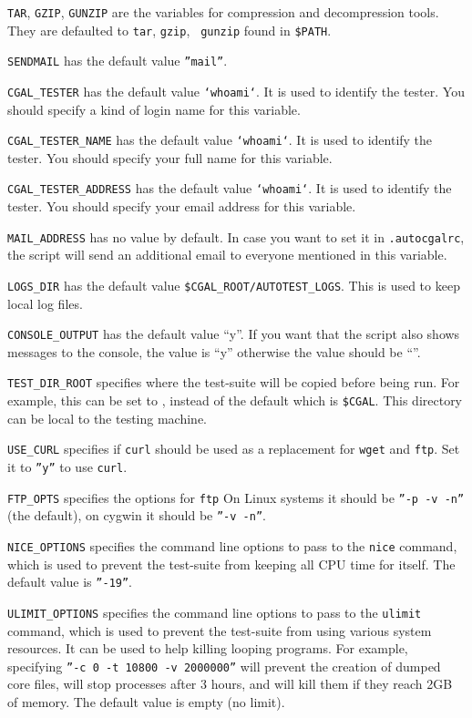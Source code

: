 {\tt TAR}, {\tt GZIP}, {\tt GUNZIP} are the variables for compression and
decompression tools.  They are defaulted to {\tt tar}, {\tt gzip}, {\tt
gunzip} found in {\tt \$PATH}.

{\tt SENDMAIL} has the default value {\tt ''mail''}.

{\tt CGAL\_TESTER} has the default value {\tt `whoami`}.  It is used to
identify the tester.  You should specify a kind of login name for this
variable.

{\tt CGAL\_TESTER\_NAME} has the default value {\tt `whoami`}.  It is used to
identify the tester.  You should specify your full name for this variable.

{\tt CGAL\_TESTER\_ADDRESS} has the default value {\tt `whoami`}.  It is used
to identify the tester.  You should specify your email address for this
variable.

{\tt MAIL\_ADDRESS} has no value by default. In case you want to
set it in {\tt .autocgalrc}, the script will send an additional email to
everyone mentioned in this variable.

{\tt LOGS\_DIR} has the default value {\tt \$CGAL\_ROOT/AUTOTEST\_LOGS}.  This
is used to keep local log files.

{\tt CONSOLE\_OUTPUT} has the default value ``y''. If you want that the script
 also shows messages to the console, the value is ``y'' otherwise the value
should be ``''.

{\tt TEST\_DIR\_ROOT} specifies where the test-suite will be copied before
being run.  For example, this can be set to , instead of the default
which is {\tt \$CGAL}.  This directory can be local to the testing machine.

{\tt USE\_CURL} specifies if {\tt curl} should be used as a replacement for
{\tt wget} and {\tt ftp}.  Set it to {\tt ''y''} to use {\tt curl}.

{\tt FTP\_OPTS} specifies the options for {\tt ftp}   On Linux systems 
it should be {\tt ''-p -v -n''} (the default), on cygwin it should be {\tt ''-v -n''}.

{\tt NICE\_OPTIONS} specifies the command line options to pass to the
{\tt nice} command, which is used to prevent the test-suite from keeping
all CPU time for itself.  The default value is {\tt ''-19''}.

{\tt ULIMIT\_OPTIONS} specifies the command line options to pass to the
{\tt ulimit} command, which is used to prevent the test-suite from using
various system resources.  It can be used to help killing looping programs.
For example, specifying {\tt ''-c 0 -t 10800 -v 2000000''} will prevent
the creation of dumped core files, will stop processes after 3 hours,
and will kill them if they reach 2GB of memory.
The default value is empty (no limit).

